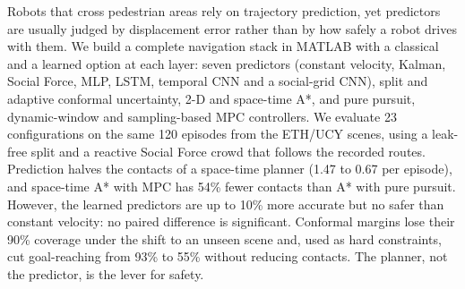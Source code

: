 Robots that cross pedestrian areas rely on trajectory prediction, yet
predictors are usually judged by displacement error rather than by how
safely a robot drives with them. We build a complete navigation stack in
MATLAB with a classical and a learned option at each layer: seven
predictors (constant velocity, Kalman, Social Force, MLP, LSTM, temporal
CNN and a social-grid CNN), split and adaptive conformal uncertainty, 2-D
and space-time A*, and pure pursuit, dynamic-window and sampling-based MPC
controllers. We evaluate 23 configurations on the same 120 episodes from
the ETH/UCY scenes, using a leak-free split and a reactive Social Force
crowd that follows the recorded routes. Prediction halves the contacts of
a space-time planner (1.47 to 0.67 per episode), and space-time A* with
MPC has 54\% fewer contacts than A* with pure pursuit. However, the learned
predictors are up to 10\% more accurate but no safer than constant
velocity: no paired difference is significant. Conformal margins lose
their 90\% coverage under the shift to an unseen scene and, used as hard
constraints, cut goal-reaching from 93\% to 55\% without reducing
contacts. The planner, not the predictor, is the lever for safety.
